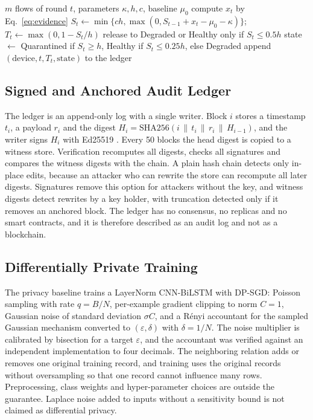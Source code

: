 \documentclass[journal]{IEEEtran}
\begin{document}
\begin{algorithm}[t]
\caption{Device trust update (one device).}
\label{alg:trust}
\begin{algorithmic}[1]
\REQUIRE $m$ flows of round $t$, parameters $\kappa,h,c$, baseline $\mu_0$
\STATE compute $x_t$ by Eq.~\eqref{eq:evidence}
\STATE $S_t\leftarrow\min\{ch,\max(0,S_{t-1}+x_t-\mu_0-\kappa)\}$; $T_t\leftarrow\max(0,1-S_t/h)$
\STATE release to Degraded or Healthy only if $S_t\le0.5h$
\ELSE
\STATE state $\leftarrow$ Quarantined if $S_t\ge h$, Healthy if $S_t\le0.25h$, else Degraded
\ENDIF
\STATE append $(\text{device},t,T_t,\text{state})$ to the ledger
\end{algorithmic}
\end{algorithm}

\subsection{Signed and Anchored Audit Ledger}
The ledger is an append-only log with a single writer. Block $i$ stores a timestamp $t_i$, a payload $r_i$ and the digest $H_i=\mathrm{SHA256}(i\,\|\,t_i\,\|\,r_i\,\|\,H_{i-1})$, and the writer signs $H_i$ with Ed25519 \cite{bernstein2012high}. Every 50 blocks the head digest is copied to a witness store. Verification recomputes all digests, checks all signatures and compares the witness digests with the chain. A plain hash chain detects only in-place edits, because an attacker who can rewrite the store can recompute all later digests. Signatures remove this option for attackers without the key, and witness digests detect rewrites by a key holder, with truncation detected only if it removes an anchored block. The ledger has no consensus, no replicas and no smart contracts, and it is therefore described as an audit log and not as a blockchain.

\subsection{Differentially Private Training}
The privacy baseline trains a LayerNorm CNN-BiLSTM with DP-SGD: Poisson sampling with rate $q=B/N$, per-example gradient clipping to norm $C=1$, Gaussian noise of standard deviation $\sigma C$, and a R\'enyi accountant for the sampled Gaussian mechanism \cite{mironov2019sampled} converted to $(\varepsilon,\delta)$ with $\delta=1/N$. The noise multiplier is calibrated by bisection for a target $\varepsilon$, and the accountant was verified against an independent implementation to four decimals. The neighboring relation adds or removes one original training record, and training uses the original records without oversampling so that one record cannot influence many rows. Preprocessing, class weights and hyper-parameter choices are outside the guarantee. Laplace noise added to inputs without a sensitivity bound is not claimed as differential privacy.
\end{document}
